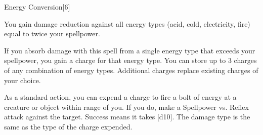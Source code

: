 \begin{spellfooter}
\begin{spellsection}{Energy Conversion}[6]
    \begin{spellheader}
    \end{spellheader}
    \begin{spellcontent}
        \begin{spelleffects}
            \spelleffect You gain damage reduction against all energy types (acid, cold, electricity, fire) equal to twice your spellpower.

            If you absorb damage with this spell from a single energy type that exceeds your spellpower, you gain a charge for that energy type. You can store up to 3 charges of any combination of energy types. Additional charges replace existing charges of your choice.

            As a standard action, you can expend a charge to fire a bolt of energy at a creature or object within \rngclose range of you. If you do, make a Spellpower vs. Reflex attack against the target. Success means it takes [d10]. The damage type is the same as the type of the charge expended.
        \end{spelleffects}
    \end{spellcontent}
    \begin{spellfooter}
        \miscastexplode
    \end{spellfooter}
\end{spellsection}


\end{spellfooter}
